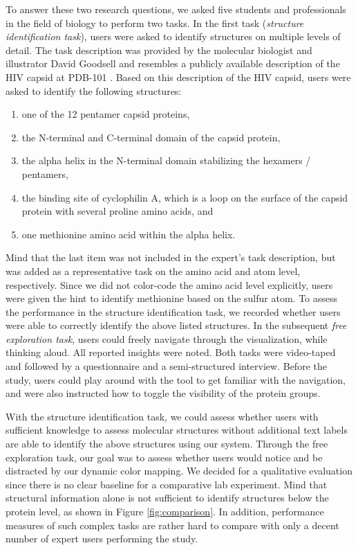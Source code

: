 \documentclass{egpubl}
\begin{document}
	To answer these two research questions, we asked five students and professionals in the field of biology to perform two tasks. 
	In the first task (\emph{structure identification task}), users were asked to identify structures on multiple levels of detail. 
	The task description was provided by the molecular biologist and illustrator David Goodsell and resembles a publicly available description of the HIV capsid at PDB-101 \cite{goodsell2016}.
	Based on this description of the HIV capsid, users were asked to identify the following structures: 
	\begin{enumerate}
		\itemsep0em 
		\item one of the 12 pentamer capsid proteins, 
		\item the N-terminal and C-terminal domain of the capsid protein, 
		\item the alpha helix in the N-terminal domain stabilizing the hexamers / pentamers, 
		\item the binding site of cyclophilin A, which is a loop on the surface of the capsid protein with several proline amino acids, and
		\item one methionine amino acid within the alpha helix.
	\end{enumerate}
	Mind that the last item was not included in the expert's task description, but was added as a representative task on the amino acid and atom level, respectively. 
	Since we did not color-code the amino acid level explicitly, users were given the hint to identify methionine based on the sulfur atom. 
	To assess the performance in the structure identification task, we recorded whether users were able to correctly identify the above listed structures. 
	In the subsequent \emph{free exploration task}, users could freely navigate through the visualization, while thinking aloud. 
	All reported insights were noted. 
	Both tasks were video-taped and followed by a questionnaire and a semi-structured interview. 
	Before the study, users could play around with the tool to get familiar with the navigation, and were also instructed how to toggle the visibility of the protein groups. 
	
	With the structure identification task, we could assess whether users with sufficient knowledge to assess molecular structures without additional text labels are able to identify the above structures using our system. 
	Through the free exploration task, our goal was to assess whether users would notice and be distracted by our dynamic color mapping. 
	We decided for a qualitative evaluation since there is no clear baseline for a comparative lab experiment. 
	Mind that structural information alone is not sufficient to identify structures below the protein level, as shown in Figure \ref{fig:comparison}. 
	In addition, performance measures of such complex tasks are rather hard to compare with only a decent number of expert users performing the study. 
	
\end{document}
